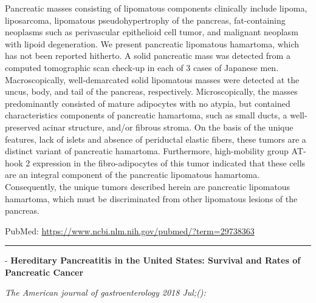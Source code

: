\documentclass[]{article}
\begin{document}
Pancreatic masses consisting of lipomatous components clinically include
lipoma, liposarcoma, lipomatous pseudohypertrophy of the pancreas,
fat-containing neoplasms such as perivascular epithelioid cell tumor,
and malignant neoplasm with lipoid degeneration. We present pancreatic
lipomatous hamartoma, which has not been reported hitherto. A solid
pancreatic mass was detected from a computed tomographic scan check-up
in each of 3 cases of Japanese men. Macroscopically, well-demarcated
solid lipomatous masses were detected at the uncus, body, and tail of
the pancreas, respectively. Microscopically, the masses predominantly
consisted of mature adipocytes with no atypia, but contained
characteristics components of pancreatic hamartoma, such as small ducts,
a well-preserved acinar structure, and/or fibrous stroma. On the basis
of the unique features, lack of islets and absence of periductal elastic
fibers, these tumors are a distinct variant of pancreatic hamartoma.
Furthermore, high-mobility group AT-hook 2 expression in the
fibro-adipocytes of this tumor indicated that these cells are an
integral component of the pancreatic lipomatous hamartoma. Consequently,
the unique tumors described herein are pancreatic lipomatous hamartoma,
which must be discriminated from other lipomatous lesions of the
pancreas.

PubMed: \url{https://www.ncbi.nlm.nih.gov/pubmed/?term=29738363}

{}

{}

\begin{center}\rule{0.5\linewidth}{\linethickness}\end{center}

 - \textbf{Hereditary Pancreatitis in the United States: Survival and
Rates of Pancreatic Cancer}

\emph{The American journal of gastroenterology 2018 Jul;():}
\end{document}

